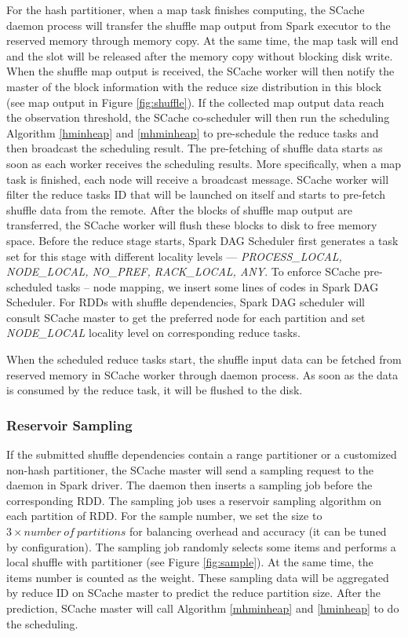 For the hash partitioner, when a map task finishes computing, the SCache daemon process will transfer the shuffle map output from Spark executor to the reserved memory through memory copy.
At the same time, the map task will end and the slot will be released after the memory copy without blocking disk write.
When the shuffle map output is received, the SCache worker will then notify the master of the block information with the reduce size distribution in this block (see map output in Figure \ref{fig:shuffle}).
If the collected map output data reach the observation threshold, the SCache co-scheduler will then run the scheduling Algorithm \ref{hminheap} and \ref{mhminheap} to pre-schedule the reduce tasks and then broadcast the scheduling result.
The pre-fetching of shuffle data starts as soon as each worker receives the scheduling results.
More specifically, when a map task is finished, each node will receive a broadcast message. SCache worker will filter the reduce tasks ID that will be launched on itself and starts to pre-fetch shuffle data from the remote. After the blocks of shuffle map output are transferred, the SCache worker will flush these blocks to disk to free memory space.
Before the reduce stage starts, Spark DAG Scheduler first generates a task set for this stage with different locality levels --- \textit{PROCESS\_LOCAL, NODE\_LOCAL, NO\_PREF, RACK\_LOCAL, ANY}.
To enforce SCache pre-scheduled tasks -- node mapping, we insert some lines of codes in Spark DAG Scheduler.
For RDDs with shuffle dependencies, Spark DAG scheduler will consult SCache master to get the preferred node for each partition and set \textit{NODE\_LOCAL} locality level on corresponding reduce tasks.

When the scheduled reduce tasks start, the shuffle input data can be fetched from reserved memory in SCache worker through daemon process. As soon as the data is consumed by the reduce task, it will be flushed to the disk.

\subsubsection{Reservoir Sampling}\label{sampling}
If the submitted shuffle dependencies contain a range partitioner or a customized non-hash partitioner, the SCache master will send a sampling request to the daemon in Spark driver. The daemon then inserts a sampling job before the corresponding RDD. The sampling job uses a reservoir sampling algorithm \cite{reservoir} on each partition of RDD. For the sample number, we set the size to $3 \times number\ of\ partitions$ for balancing overhead and accuracy (it can be tuned by configuration). The sampling job randomly selects some items and performs a local shuffle with partitioner (see Figure \ref{fig:sample}). At the same time, the items number is counted as the weight. These sampling data will be aggregated by reduce ID on SCache master to predict the reduce partition size. After the prediction, SCache master will call Algorithm \ref{mhminheap} and \ref{hminheap} to do the scheduling.

